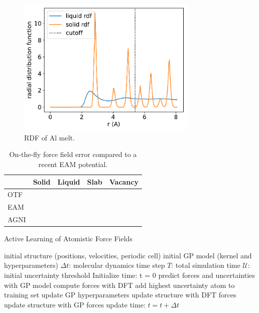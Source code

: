 \documentclass[%
reprint,
superscriptaddress,
amsmath,amssymb,
aps,
prl,
]{revtex4-1}
\begin{document}
\begin{figure}
	\centering
	\includegraphics[width=3.4in]{rdf.pdf}
	\caption{RDF of Al melt.}
\end{figure}

\begin{table}
\begin{tabular}
{ |p{1.4cm}|| >{\centering} p{1.4cm}| >{\centering} p{1.4cm}| >{\centering} p{1.4cm}| p{1.4cm} <{\centering}|  }
	\hline
	 & Solid & Liquid & Slab & Vacancy \\
	\hline
	OTF & & & & \\
	\hline
	EAM & & & & \\
  \hline
	AGNI & & & & \\
	\hline
\end{tabular}
\caption{On-the-fly force field error compared to a recent EAM potential.}
\end{table}

\begin{algorithm}[H]
  \caption{Active Learning of Atomistic Force Fields}
  \label{EPSA}
   \begin{algorithmic}[1]
   \Require initial structure (positions, velocities, periodic cell)
   \Require initial GP model (kernel and hyperparameters)
   \Require $\Delta t$: molecular dynamics time step
   \Require $T$: total simulation time
   \Require $\mathcal{U}$: initial uncertainty threshold
   \State Initialize time: t = 0
   \State predict forces and uncertainties with GP model
   \State compute forces with DFT
   \State add highest uncertainty atom to training set
   \State update GP hyperparameters
   \State update structure with DFT forces
   \Else
   \State update structure with GP forces
   \EndIf
   \State update time: $t = t + \Delta t$
   \EndWhile
   \end{algorithmic}
\end{algorithm}
\end{document}
